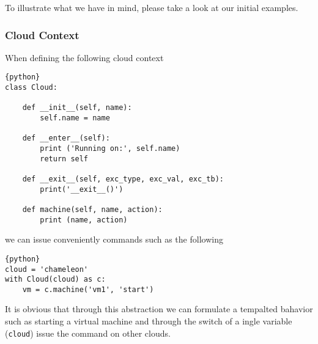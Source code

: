To illustrate what we have in mind, please take a look at our initial
examples.

\subsubsection{Cloud Context}

When defining the following cloud context 

\begin{lstlisting}{python}
class Cloud:
    
    def __init__(self, name):
        self.name = name

    def __enter__(self):
        print ('Running on:', self.name)
        return self

    def __exit__(self, exc_type, exc_val, exc_tb):
        print('__exit__()')

    def machine(self, name, action):
        print (name, action)
\end{lstlisting}

we can issue conveniently commands such as the following 

\begin{lstlisting}{python}
cloud = 'chameleon'
with Cloud(cloud) as c:
    vm = c.machine('vm1', 'start')
\end{lstlisting}

It is obvious that through this abstraction we can formulate a
tempalted bahavior such as starting a virtual machine and through the
switch of a ingle variable (\verb|cloud|) issue the command on other
clouds.


